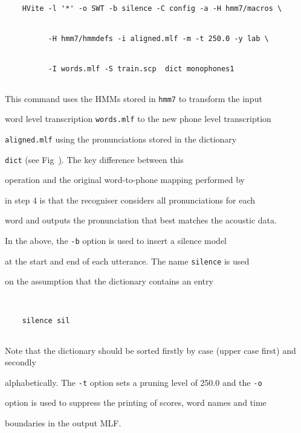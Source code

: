 \begin{verbatim}


    HVite -l '*' -o SWT -b silence -C config -a -H hmm7/macros \


          -H hmm7/hmmdefs -i aligned.mlf -m -t 250.0 -y lab \


          -I words.mlf -S train.scp  dict monophones1 


\end{verbatim}


This command uses the HMMs stored in \texttt{hmm7} to transform the input


word level transcription \texttt{words.mlf} to the new phone level transcription


\texttt{aligned.mlf} using the pronunciations stored in the dictionary


\texttt{dict} (see Fig~\href{f:step8}).   The key difference between this


operation and the original word-to-phone mapping performed by 


in step 4 is that the recogniser considers all pronunciations for each


word and outputs the pronunciation that best matches the acoustic data.







In the above, the \texttt{-b} option is used to insert a silence model


at the start and end of each utterance.  The name \texttt{silence} is used


on the assumption that the dictionary contains an entry


\begin{verbatim}


    silence sil


\end{verbatim}


Note that the dictionary should be sorted firstly by case (upper case first) and secondly 


alphabetically.  The \texttt{-t} option sets a pruning level of 250.0 and the \texttt{-o} 


option is used to suppress the printing of scores, word names and time


boundaries in the output MLF.





